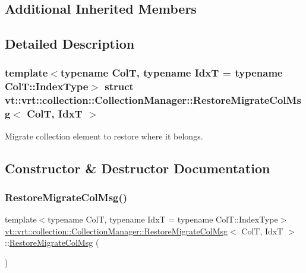 \subsection*{Additional Inherited Members}


\subsection{Detailed Description}
\subsubsection*{template$<$typename ColT, typename IdxT = typename Col\+T\+::\+Index\+Type$>$\newline
struct vt\+::vrt\+::collection\+::\+Collection\+Manager\+::\+Restore\+Migrate\+Col\+Msg$<$ Col\+T, Idx\+T $>$}

Migrate collection element to restore where it belongs. 



\subsection{Constructor \& Destructor Documentation}
\mbox{\label{structvt_1_1vrt_1_1collection_1_1_collection_manager_1_1_restore_migrate_col_msg_a70c06119d41dc7516bff3d8619ad53f0}} 
\subsubsection{\texorpdfstring{Restore\+Migrate\+Col\+Msg()}{RestoreMigrateColMsg()}\hspace{0.1cm}{\footnotesize\ttfamily [1/2]}}
{\footnotesize\ttfamily template$<$typename ColT, typename IdxT = typename Col\+T\+::\+Index\+Type$>$ \\
\hyperlink{structvt_1_1vrt_1_1collection_1_1_collection_manager_1_1_restore_migrate_col_msg}{vt\+::vrt\+::collection\+::\+Collection\+Manager\+::\+Restore\+Migrate\+Col\+Msg}$<$ ColT, IdxT $>$\+::\hyperlink{structvt_1_1vrt_1_1collection_1_1_collection_manager_1_1_restore_migrate_col_msg}{Restore\+Migrate\+Col\+Msg} (\begin{DoxyParamCaption}{ }\end{DoxyParamCaption})\hspace{0.3cm}{\ttfamily [default]}}

